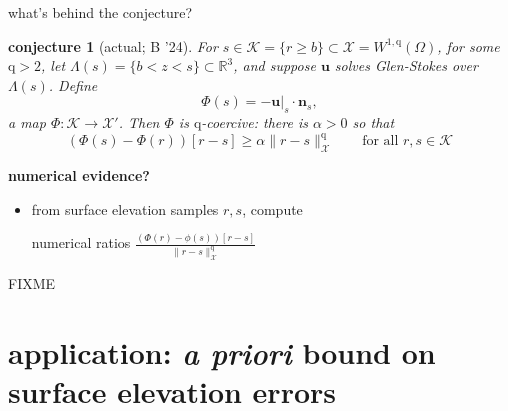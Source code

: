 \documentclass[10pt,svgnames]{beamer}
\newtheorem*{conjecture}{conjecture}
\newcommand{\bn}{\mathbf{n}}
\newcommand{\bu}{\mathbf{u}}
\newcommand{\cK}{\mathcal{K}}
\newcommand{\cX}{\mathcal{X}}
\newcommand{\RR}{\mathbb{R}}
\newcommand{\qq}{\mathrm{q}}
\begin{document}
\begin{frame}{what's behind the conjecture?}

\bigskip
\begin{conjecture}[actual; B '24]
For $s \in \cK = \{r \ge b\} \subset \cX = W^{1,\qq}(\Omega)$, for some $\qq>2$, let $\Lambda(s) = \{b<z<s\} \subset \RR^3$, and suppose $\bu$ solves Glen-Stokes over $\Lambda(s)$.  Define
	$$\Phi(s) = - \bu|_s \cdot \bn_s,$$
a map $\Phi:\cK \to \cX'$.  Then $\Phi$ is $\qq$-coercive: there is $\alpha>0$ so that
	$$\left(\Phi(s) - \Phi(r)\right)[r-s] \ge \alpha \|r-s\|_\cX^\qq \qquad \text{for all } r,s\in\cK$$
\end{conjecture}

\bigskip
\footnotesize
\noindent \textbf{numerical evidence?}

\begin{itemize}
\item from surface elevation samples $r,s$, compute

numerical ratios $\displaystyle \frac{(\Phi(r)-\phi(s))[r-s]}{\|r-s\|_\cX^\qq}$
\end{itemize}

\vspace{-22mm}
FIXME %
\end{frame}


\section{application:  \emph{a priori} bound on surface elevation errors}
\end{document}
